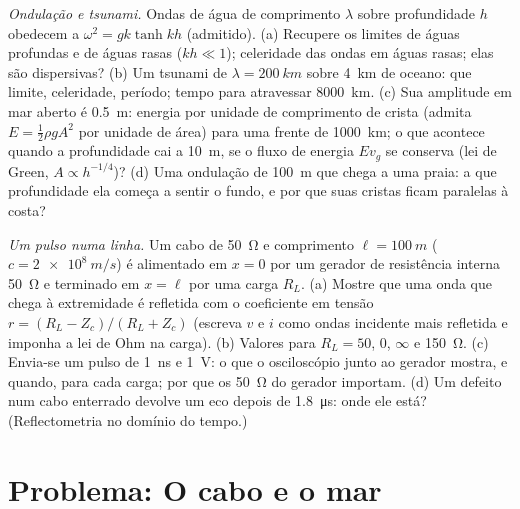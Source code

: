 \begin{exercise}[$\star\star\star$]\label{exo:b2:dispersion-wave-packets:11}
\emph{Ondulação e tsunami.} Ondas de água de comprimento $\lambda$ sobre profundidade $h$
obedecem a $\omega^2 = gk\tanh kh$ (admitido). (a) Recupere os limites de águas profundas e de
águas rasas ($kh \ll 1$); celeridade das ondas em águas rasas; elas
são dispersivas? (b) Um tsunami de $\lambda = \qty{200}{km}$ sobre \qty{4}{km} de oceano:
que limite, celeridade, período; tempo para atravessar \qty{8000}{km}. (c) Sua
amplitude em mar aberto é \qty{0.5}{m}: energia por unidade de comprimento de crista
(admita $E = \tfrac12\rho gA^2$ por unidade de área) para uma frente de \qty{1000}{km}; o que
acontece quando a profundidade cai a \qty{10}{m}, se o fluxo de energia $Ev_g$ se
conserva (lei de Green, $A \propto h^{-1/4}$)? (d) Uma ondulação de \qty{100}{m}
que chega a uma praia: a que profundidade ela começa a sentir o fundo,
e por que suas cristas ficam paralelas à costa?
\end{exercise}

\begin{exercise}[$\star\star\star$]\label{exo:b2:dispersion-wave-packets:12}
\emph{Um pulso numa linha.} Um cabo de \qty{50}{\ohm} e comprimento $\ell = \qty{100}{m}$
($c = \qty{2e8}{m/s}$) é alimentado em $x = 0$ por um gerador de resistência
interna \qty{50}{\ohm} e terminado em $x = \ell$ por uma carga $R_L$. (a) Mostre
que uma onda que chega à extremidade é refletida com o coeficiente
em tensão $r = (R_L - Z_c)/(R_L + Z_c)$ (escreva $v$ e $i$ como ondas incidente
mais refletida e imponha a lei de Ohm na carga). (b) Valores para
$R_L = 50$, $0$, $\infty$ e \qty{150}{\ohm}. (c) Envia-se um pulso de \qty{1}{ns} e \qty{1}{V}:
o que o osciloscópio junto ao gerador mostra, e quando, para cada
carga; por que os \qty{50}{\ohm} do gerador importam. (d) Um defeito num cabo
enterrado devolve um eco depois de \qty{1.8}{\micro s}: onde ele está? (Reflectometria
no domínio do tempo.)
\end{exercise}

\section{Problema: O cabo e o mar}


